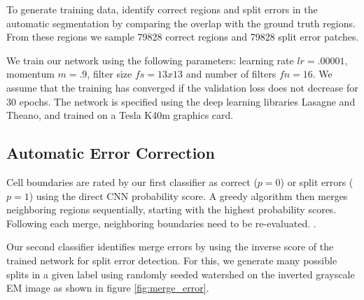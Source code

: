 To generate training data, identify correct regions and split errors in the automatic segmentation by comparing the overlap with the ground truth regions. From these regions we sample 79828 correct regions and 79828 split error patches.

We train our network using the following parameters: learning rate $lr=.00001$, momentum $m=.9$, filter size $fs=13x13$ and number of filters $fn=16$. We assume that the training has converged if the validation loss does not decrease for 30 epochs. The network is specified using the deep learning libraries Lasagne and Theano, and trained on a Tesla K40m graphics card. 

\subsection{Automatic Error Correction}
Cell boundaries are rated by our first classifier as correct ($p=0$) or split errors ($p=1$) using the direct CNN probability score. A greedy algorithm then merges neighboring regions sequentially, starting with the highest probability scores. Following each merge, neighboring boundaries need to be re-evaluated. .

Our second classifier identifies merge errors by using the inverse score of the trained network for split error detection. For this, we generate many possible splits in a given label using randomly seeded watershed on the inverted grayscale EM image as shown in figure \ref{fig:merge_error}.  

%
